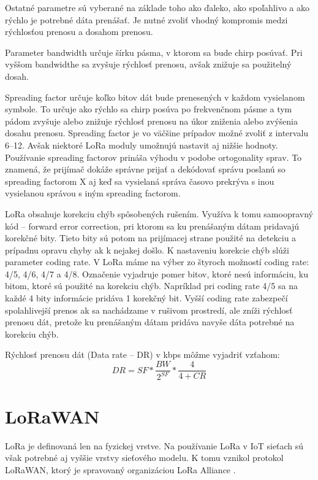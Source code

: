 \documentclass[slovak,master]{diploma}
\begin{document}
Ostatné parametre sú vyberané na základe toho ako ďaleko, ako spoľahlivo a ako rýchlo je potrebné dáta prenášať. Je nutné zvoliť vhodný kompromis medzi rýchlosťou prenosu 
a dosahom prenosu.

Parameter bandwidth určuje šírku pásma, v ktorom sa bude chirp posúvať. Pri vyššom bandwidthe sa zvyšuje rýchlosť prenosu, avšak znižuje sa použitelný dosah.

Spreading factor určuje koľko bitov dát bude prenesených v každom vysielanom symbole. To určuje ako rýchlo sa chirp posúva po frekvenčnom pásme a tym pádom 
zvyšuje alebo znižuje rýchlosť prenosu na úkor zniženia alebo zvýšenia dosahu prenosu. Spreading factor je vo väčšine prípadov možné zvoliť z intervalu 6--12. 
Avšak niektoré LoRa moduly umožnujú nastavit aj nižšie hodnoty. 
Používanie spreading factorov prináša výhodu v podobe ortogonality sprav. To znamená, že prijímač dokáže správne prijať a dekódovať správu poslanú so spreading factorom X aj 
keď sa vysielaná správa časovo prekrýva s inou vysielanou správou s iným spreading factorom.

LoRa obsahuje korekciu chýb spôsobených rušením. Využíva k tomu samoopravný kód -- forward error correction, pri ktorom 
sa ku prenášaným dátam pridavajú korekčné bity. Tieto bity sú potom na prijímacej strane použité na detekciu a prípadnu opravu chyby ak k nejakej došlo.
K nastaveniu korekcie chýb slúži parameter coding rate.
V LoRa máme na výber zo štyroch možností coding rate: 4/5, 4/6, 4/7 a 4/8. Označenie vyjadruje pomer bitov, ktoré nesú informáciu, ku bitom, ktoré sú 
použité na korekciu chýb. Napríklad pri coding rate 4/5 sa na každé 4 bity informácie pridáva 1 korekčný bit.
Vyšší coding rate zabezpečí spolahlivejší prenos ak sa nachádzame v rušivom prostredí, ale zníži rýchlosť prenosu dát, 
pretože ku prenášaným dátam pridáva navyše dáta potrebné na korekciu chýb.

Rýchlosť prenosu dát (Data rate -- DR) v kbps môžme vyjadriť vzťahom:
\begin{equation}
  DR = SF * \frac{BW}{2^{SF}} * \frac{4}{4+CR}
\end{equation}

\section{LoRaWAN}
LoRa je definovaná len na fyzickej vrstve. Na používanie LoRa v IoT sieťach sú však potrebné aj vyššie vrstvy sieťového modelu.
K tomu vznikol protokol LoRaWAN, ktorý je spravovaný organizáciou LoRa Alliance \cite{lora}.
\end{document}
